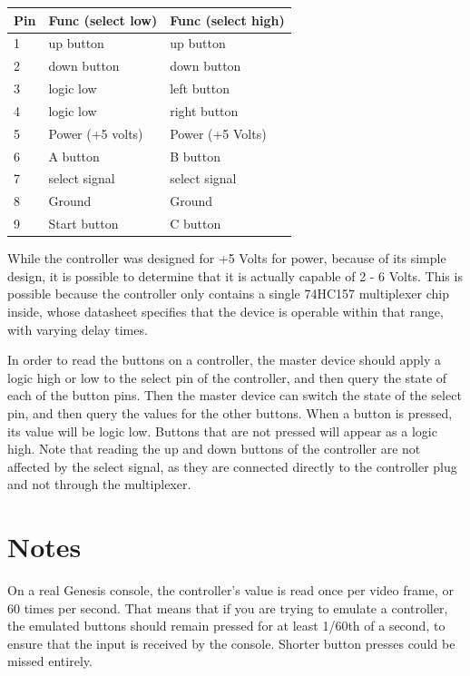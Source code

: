 \documentclass{capstonedoc}
\begin{document}
\vspace{5mm}
\begin{tabular}{ l | l | l }
  Pin & Func (select low) & Func (select high) \\ \hline \hline
  1   & up button         & up button          \\
  2   & down button       & down button        \\
  3   & logic low         & left button        \\
  4   & logic low         & right button       \\
  5   & Power (+5 volts)  & Power (+5 Volts)   \\
  6   & A button          & B button           \\
  7   & select signal     & select signal      \\
  8   & Ground            & Ground             \\
  9   & Start button      & C button           \\
\end{tabular}
\vspace{5mm}

While the controller was designed for +5 Volts for power, because of its simple
design, it is possible to determine that it is actually capable of 2 - 6 Volts.
This is possible because the controller only contains a single 74HC157
multiplexer chip inside, whose datasheet specifies that the device is operable
within that range, with varying delay times.\cite{TC74HC157AP}

In order to read the buttons on a controller, the master device should apply
a logic high or low to the select pin of the controller, and then query the
state of each of the button pins. Then the master device can switch the state
of the select pin, and then query the values for the other buttons. When a
button is pressed, its value will be logic low. Buttons that are not pressed
will appear as a logic high. Note that reading the up and down buttons of
the controller are not affected by the select signal, as they are connected
directly to the controller plug and not through the multiplexer.

\section{Notes}
On a real Genesis console, the controller's value is read once per video frame,
or 60 times per second. That means that if you are trying to emulate a
controller, the emulated buttons should remain pressed for at least 1/60th of
a second, to ensure that the input is received by the console. Shorter button
presses could be missed entirely.
\end{document}
